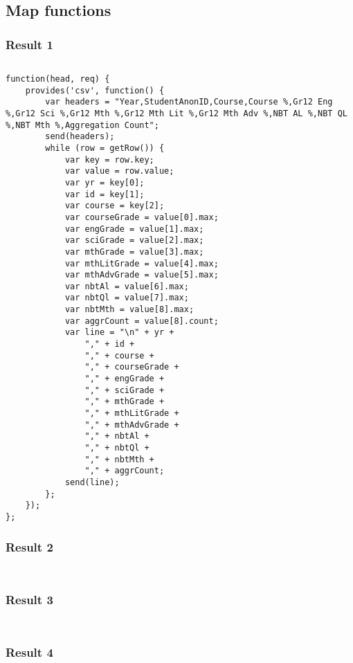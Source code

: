 \subsection{Map functions}
\subsubsection{Result 1}
\label{result-1-map}
\begin{verbatim}
\end{verbatim}
\label{result-1-list}
\begin{verbatim}
function(head, req) {
    provides('csv', function() {
        var headers = "Year,StudentAnonID,Course,Course %,Gr12 Eng %,Gr12 Sci %,Gr12 Mth %,Gr12 Mth Lit %,Gr12 Mth Adv %,NBT AL %,NBT QL %,NBT Mth %,Aggregation Count";
        send(headers);
        while (row = getRow()) {
            var key = row.key;
            var value = row.value;
            var yr = key[0];
            var id = key[1];
            var course = key[2];
            var courseGrade = value[0].max;
            var engGrade = value[1].max;
            var sciGrade = value[2].max;
            var mthGrade = value[3].max;
            var mthLitGrade = value[4].max;
            var mthAdvGrade = value[5].max;
            var nbtAl = value[6].max;
            var nbtQl = value[7].max;
            var nbtMth = value[8].max;
            var aggrCount = value[8].count;
            var line = "\n" + yr +
                "," + id +
                "," + course +
                "," + courseGrade +
                "," + engGrade +
                "," + sciGrade +
                "," + mthGrade +
                "," + mthLitGrade +
                "," + mthAdvGrade +
                "," + nbtAl +
                "," + nbtQl +
                "," + nbtMth +
                "," + aggrCount;
            send(line);
        };
    });
};
\end{verbatim}

\subsubsection{Result 2}
\label{result-2-map}
\begin{verbatim}
\end{verbatim}
\label{result-2-list}
\begin{verbatim}
\end{verbatim}

\subsubsection{Result 3}
\label{result-3-map}
\begin{verbatim}
\end{verbatim}
\label{result-3-list}
\begin{verbatim}
\end{verbatim}

\subsubsection{Result 4}
\label{result-4-map}
\begin{verbatim}
\end{verbatim}
\label{result-4-list}
\begin{verbatim}
\end{verbatim}
